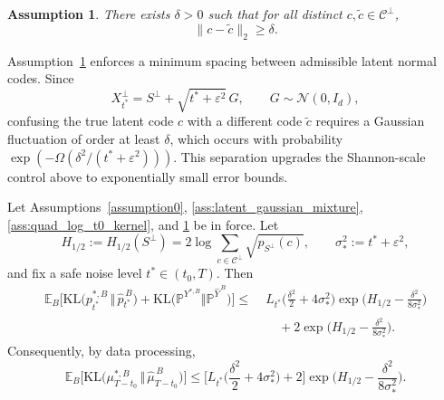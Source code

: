 \documentclass[twoside,11pt]{article}
\newcommand{\E}{\mathbb{E}}
\newcommand{\PP}{\mathbb{P}}
\newcommand{\Nc}{\mathcal{N}}
\newcommand{\Cc}{\mathcal{C}}
\newcommand{\KL}{\mathrm{KL}}
\numberwithin{equation}{section}
\newtheorem{assumption}{Assumption}[section]
\begin{document}
\begin{assumption}
\label{ass:delta_sep_S}
There exists \(\delta>0\) such that for all distinct \(c,\tilde c\in\Cc^\perp\),
\[
\|c-\tilde c\|_2 \ge \delta.
\]
\end{assumption}

Assumption~\ref{ass:delta_sep_S} enforces a minimum spacing between admissible latent normal
codes. Since
\[
X_{t^*}^\perp = S^\perp + \sqrt{t^*+\varepsilon^2}\,G,
\qquad G\sim\Nc(0,I_d),
\]
confusing the true latent code \(c\) with a different code \(\tilde c\) requires a Gaussian
fluctuation of order at least \(\delta\), which occurs with probability
\(\exp(-\Omega(\delta^2/(t^*+\varepsilon^2)))\). This separation upgrades the Shannon-scale
control above to exponentially small error bounds.

\begin{theorem}
\label{thm:total_error_sep_renyi_single}
Let Assumptions~\ref{assumption0}, \ref{ass:latent_gaussian_mixture},
\ref{ass:quad_log_t0_kernel}, and \ref{ass:delta_sep_S} be in force. Let
\[
H_{1/2} := H_{1/2}(S^\perp)
=
2\log \sum_{c\in\Cc^\perp}\sqrt{p_{S^\perp}(c)},
\qquad
\sigma_*^2 := t^*+\varepsilon^2,
\]
and fix a safe noise level \(t^*\in(t_0,T)\). Then
\begin{align}
\label{eq:total_error_sep_renyi_single}
\E_B\!\Big[
\KL\!\big(p_{t^*}^{*,B}\,\Vert\,\hat p_{t^*}^{\,B}\big)
+
\KL\!\big(\PP^{Y^{*,B}}\Vert \PP^{\hat Y^{\,B}}\big)
\Big]
\le\;&
L_{t^*}\Big(\frac{\delta^2}{2}+4\sigma_*^2\Big)
\exp\!\Big(H_{1/2}-\frac{\delta^2}{8\sigma_*^2}\Big)
\nonumber\\
&\quad
+
2\exp\!\Big(H_{1/2}-\frac{\delta^2}{8\sigma_*^2}\Big).
\end{align}
Consequently, by data processing,
\begin{equation}
\label{eq:terminal_sep_renyi_single}
\E_B\!\Big[
\KL\!\big(\mu_{T-t_0}^{*,B}\,\Vert\,\hat\mu_{T-t_0}^{\,B}\big)
\Big]
\le
\Big[
L_{t^*}\Big(\frac{\delta^2}{2}+4\sigma_*^2\Big)+2
\Big]
\exp\!\Big(H_{1/2}-\frac{\delta^2}{8\sigma_*^2}\Big).
\end{equation}
\end{theorem}
\end{document}
